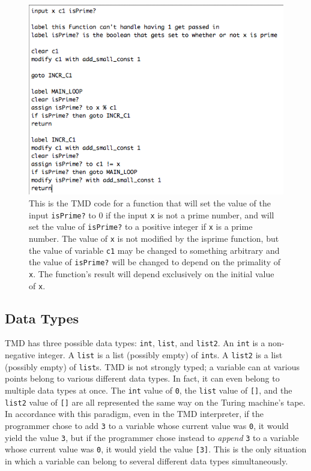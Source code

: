 \documentclass{report}
\begin{document}
\begin{figure} 
\begin{center} 
\includegraphics[scale=0.75]{figs/isprime.png} 
\caption{This is the TMD code for a function that will set the value of the input \texttt{isPrime?} to 0 if the input \texttt{x} is not a prime number, and will set the value of \texttt{isPrime?} to a positive integer if \texttt{x} is a prime number. The value of \texttt{x} is not modified by the isprime function, but the value of variable \texttt{c1} may be changed to something arbitrary and the value of \texttt{isPrime?} will be changed to depend on the primality of \texttt{x}. The function's result will depend exclusively on the initial value of \texttt{x}. \label{fig:isprime}} 
\end{center} 
\end{figure}

\subsection{Data Types}

TMD has three possible data types: \texttt{int}, \texttt{list}, and \texttt{list2}. An \texttt{int} is a non-negative integer. A \texttt{list} is a list (possibly empty) of \texttt{int}s. A \texttt{list2} is a list (possibly empty) of \texttt{list}s. TMD is not strongly typed; a variable can at various points belong to various different data types. In fact, it can even belong to multiple data types at once. The \texttt{int} value of \texttt{0}, the \texttt{list} value of \texttt{[]}, and the \texttt{list2} value of \texttt{[]} are all represented the same way on the Turing machine's tape. In accordance with this paradigm, even in the TMD interpreter, if the programmer chose to add \texttt{3} to a variable whose current value was \texttt{0}, it would yield the value \texttt{3}, but if the programmer chose instead to \emph{append} \texttt{3} to a variable whose current value was \texttt{0}, it would yield the value \texttt{[3]}. This is the only situation in which a variable can belong to several different data types simultaneously.
\end{document}

